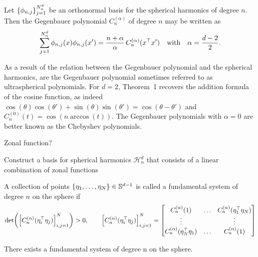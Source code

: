 \begin{theorem}
    \label{theorem:addition}
    Let $\{\phi_{n,j}\}_{j=1}^{N^d_n}$ be an orthonormal basis for the spherical harmonics of degree $n$. Then the Gegenbauer polynomial $C_n^{(\alpha)}$ of degree $n$ may be written as
\begin{equation}
    \sum_{j=1}^{N^d_n} \phi_{n, j}(x) \phi _{n, j}(x') = \frac{n + \alpha}{\alpha}\,
    C_n^{(\alpha)}(x^{\top} x')\quad\text{with}\quad \alpha = \frac{d-2}{2}.
\end{equation}
\end{theorem}
As a result of the relation between the Gegenbauer polynomial and the spherical harmonics, are the Gegenbauer polynomial sometimes referred to as ultraspherical polynomials. For $d=2$, Theorem~1 recovers the addition formula of the cosine function, as indeed $\cos(\theta) \cos(\theta') + \sin(\theta) \sin(\theta') = \cos(\theta - \theta')$ and $C_n^{(0)}(t) = \cos(n \arccos(t))$. The Gegenbauer polynomials with $\alpha=0$ are better known as the Chebyshev polynomials.

Zonal function?

Construct a basis for spherical harmonics $\mathcal{H}_n^d$ that consists of a linear combination of zonal functions 

\begin{definition}
    A collection of points $\{\eta_1, \ldots, \eta_N \} \in \mathbb{S}^{d-1}$ is called a fundamental system of degree $n$ on the sphere if
    \begin{equation}
        \textrm{det}\left({\left[C_n^{(\alpha)}(\eta_i\transpose\eta_j)\right]_{i,j=1}^N}\right) > 0,\qquad
        {\left[C_n^{(\alpha)}(\eta_i\transpose\eta_j)\right]_{i,j=1}^N} = 
        \begin{bmatrix}
            C_n^{(\alpha)}(1) & \ldots & C_n^{(\alpha)}(\eta_1\transpose\eta_N) \\
            \vdots & & \vdots \\
            C_n^{(\alpha)}(\eta_N\transpose\eta_1) & \ldots & C_n^{(\alpha)}(1)
        \end{bmatrix}
    \end{equation}
\end{definition}

\begin{lemma}
    There exists a fundamental system of degree n on the sphere.
\end{lemma}



